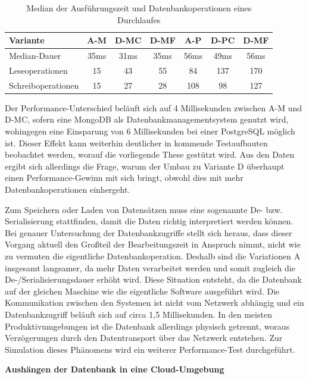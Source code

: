 \begin{table}[htpb]
	\centering
	\begin{tabular}{ | >{\raggedright\arraybackslash}m{} || c | c | c | c | c | c | } 
		\hline
		Variante & A-M & D-MC & D-MF & A-P & D-PC & D-MF \\ 
		\hline
		Median-Dauer & 35ms & 31ms & 35ms & 56ms & 49ms & 56ms \\
		\hline
		Leseoperationen & 15 & 43 &  55 &  84 & 137 & 170 \\
		\hline
		Schreiboperationen & 15 & 27 & 28 & 108 & 98 & 127 \\
		\hline
	\end{tabular}
	\caption{Median der Ausführungszeit und Datenbankoperationen eines Durchlaufes}
	\label{fig:durationofexecution}
\end{table}

Der Performance-Unterschied beläuft sich auf 4 Millisekunden zwischen A-M und D-MC, sofern eine MongoDB als Datenbankmanagementsystem genutzt wird, wohingegen eine Einsparung von 6 Millisekunden bei einer PostgreSQL möglich ist. Dieser Effekt kann weiterhin deutlicher in kommende Testaufbauten beobachtet werden, worauf die vorliegende These gestützt wird. Aus den Daten ergibt sich allerdings die Frage, warum der Umbau zu Variante D überhaupt einen Performance-Gewinn mit sich bringt, obwohl dies mit mehr Datenbankoperationen einhergeht. 

Zum Speichern oder Laden von Datensätzen muss eine sogenannte De- bzw. \Gls{Serialisierung} stattfinden, damit die Daten richtig interpretiert werden können. Bei genauer Untersuchung der Datenbankzugriffe stellt sich heraus, dass dieser Vorgang aktuell den Großteil der Bearbeitungszeit in Anspruch nimmt, nicht wie zu vermuten die eigentliche Datenbankoperation. Deshalb sind die Variationen A insgesamt langsamer, da mehr Daten verarbeitet werden und somit zugleich die De-/Serialisierungsdauer erhöht wird. Diese Situation entsteht, da die Datenbank auf der gleichen Maschine wie die eigentliche Software ausgeführt wird. Die Kommunikation zwischen den Systemen ist nicht vom Netzwerk abhängig und ein Datenbankzugriff beläuft sich auf circa 1,5 Millisekunden. In den meisten Produktivumgebungen ist die Datenbank allerdings physisch getrennt, woraus Verzögerungen durch den Datentransport über das Netzwerk entstehen. Zur Simulation dieses Phänomens wird ein weiterer Performance-Test durchgeführt. 

\textbf{Aushängen der Datenbank in eine Cloud-Umgebung}

